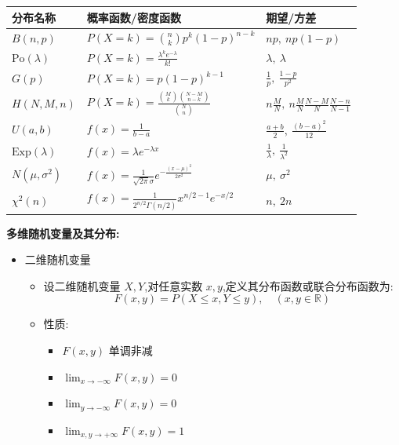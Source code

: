 \documentclass[10pt]{article}
\begin{document}
\begin{multicols}{2}
\begin{center}
\renewcommand{\arraystretch}{1.2}
\setlength{\tabcolsep}{2pt}
\begin{tabular}{|p{2.2cm}|p{4.2cm}|p{3.2cm}|}
\hline
分布名称 & 概率函数/密度函数 & 期望/方差 \\
\hline
$B(n,p)$ & $P(X=k)=\binom{n}{k}p^k(1-p)^{n-k}$ & $np,\ np(1-p)$ \\
\hline
$\mathrm{Po}(\lambda)$ & $P(X=k)=\frac{\lambda^k e^{-\lambda}}{k!}$ & $\lambda,\ \lambda$ \\
\hline
$G(p)$ & $P(X=k)=p(1-p)^{k-1}$ & $\frac{1}{p},\ \frac{1-p}{p^2}$ \\
\hline
$H(N, M, n)$ & $P(X=k)=\frac{\binom{M}{k}\binom{N-M}{n-k}}{\binom{N}{n}}$ & $n\frac{M}{N},\ n\frac{M}{N}\frac{N-M}{N}\frac{N-n}{N-1}$ \\
\hline
$U(a,b)$ & $f(x)=\frac{1}{b-a}$ & $\frac{a+b}{2},\ \frac{(b-a)^2}{12}$ \\
\hline
$\mathrm{Exp}(\lambda)$ & $f(x)=\lambda e^{-\lambda x}$ & $\frac{1}{\lambda},\ \frac{1}{\lambda^2}$ \\
\hline
$N(\mu, \sigma^2)$ & $f(x)=\frac{1}{\sqrt{2\pi}\sigma}e^{-\frac{(x-\mu)^2}{2\sigma^2}}$ & $\mu,\ \sigma^2$ \\
\hline
$\chi^2(n)$ & $f(x)=\frac{1}{2^{n/2}\Gamma(n/2)}x^{n/2-1}e^{-x/2}$ & $n,\ 2n$ \\
\hline
\end{tabular}
\end{center}

\textbf{多维随机变量及其分布:}

\begin{itemize}

\item 二维随机变量
  \begin{itemize}
    \item 设二维随机变量 \(X, Y\),对任意实数 \(x, y\),定义其分布函数或联合分布函数为:
      \[
      F(x, y) = P(X \leq x, Y \leq y), \quad (x, y \in \mathbb{R})
      \]
    \item 性质:
      \begin{itemize}
        \item \(F(x, y)\) 单调非减
        \item \(\lim_{x \to -\infty} F(x, y) = 0\)
        \item \(\lim_{y \to -\infty} F(x, y) = 0\)
        \item \(\lim_{x, y \to +\infty} F(x, y) = 1\)
      \end{itemize}
  \end{itemize}


\end{itemize}
\end{multicols}
\end{document}
